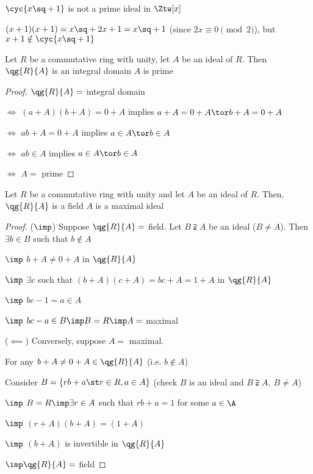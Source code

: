 \begin{example}
  \( \cyc{x\sq + 1} \) is not a prime ideal in \( \Ztw[x] \)
  \begin{note}
    \( (x+1)(x+1) = x\sq + 2x + 1 = x\sq + 1 \) (since \( 2x\equiv 0\pmod 2 \)), but \( x+1 \notin\cyc{x\sq+1} \)
  \end{note}
\end{example}

\begin{theorem}
  Let \( R \) be a commutative ring with unity, let \( A \) be an ideal of \( R \). Then \( \qg{R}{A} \) is an integral domain \tiff \( A \) is prime
\end{theorem}

\begin{proof}
  \( \qg{R}{A} = \) integral domain

  \( \iff \) \( (a+A)(b+A) = 0+A \) implies \( a+A = 0+A \tor b+A = 0+A \)

  \( \iff \) \( ab+A = 0+A \) implies \( a\in A \tor b\in A \)

  \( \iff \) \( ab\in A \) implies \( a\in A \tor b\in A \)

  \( \iff \) \( A = \) prime
\end{proof}

\begin{theorem}
  Let \( R \) be a commutative ring with unity and let \( A \) be an ideal of \( R \). Then, \( \qg{R}{A} \) is a field \tiff \( A \) is a maximal ideal
\end{theorem}

\begin{proof}
  (\( \imp \)) Suppose \( \qg{R}{A} = \) field. Let \( B\supsetneqq A \) be an ideal (\( B\neq A \)). Then \( \exists b \in B \) such that \( b\not\in A \)

    \( \imp \) \( b+A \neq 0+A \) in \( \qg{R}{A} \)

    \( \imp \) \( \exists c \) such that \( (b+A)(c+A) = bc+A = 1+A \) in \( \qg{R}{A} \)

    \( \imp \) \( bc-1 = a \in A \)

    \( \imp \) \( bc-a \in B \imp B = R \imp A = \) maximal

    (\( \impliedby \)) Conversely, suppose \( A = \) maximal.

    For any \( b+A \neq 0+A \in\qg{R}{A} \) (i.e. \( b\not\in A \))

    Consider \( B = \{rb+a \st r\in R, a\in A\} \) (check \( B \) is an ideal and \( B\supsetneqq A,\ B\neq A \))

    \( \imp \) \( B = R \imp \exists r\in A \) such that \( rb+a = 1 \) for some \( a\in\A \)

    \( \imp \) \( (r+A)(b+A) = (1+A) \)

    \( \imp \) \( (b+A) \) is invertible in \( \qg{R}{A} \)

    \( \imp \qg{R}{A} = \) field
\end{proof}

